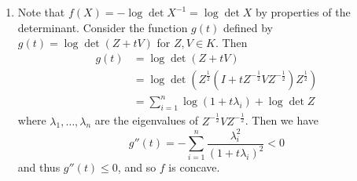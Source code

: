 \begin{enumerate}[label*=Ex \arabic*.]
\begin{enumerate}
  \item
    Note that $f(X) = - \log \det X^{-1} = \log \det X$ by
    properties of the determinant. Consider the function $g(t)$
    defined by $g(t) = \log \det (Z + tV)$ for $Z, V \in K$.  Then
    \begin{align}
      \label{eq:6}
      g(t) &= \log \det (Z + tV) \\
      &= \log \det (Z^{\frac{1}{2}}(I + t Z^{-\frac{1}{2}} V
      Z^{-\frac{1}{2}})Z^{\frac{1}{2}}) \\
      &= \sum_{i=1}^{n} \log (1 + t \lambda_{i}) + \log \det Z
    \end{align} where $\lambda_{1}, \dots, \lambda_{n}$ are the
    eigenvalues of $Z^{-\frac{1}{2}} V Z^{-\frac{1}{2}}$.  Then we
    have
    \begin{equation}
      \label{eq:9}
      g''(t) = -\sum_{i=1}^{n} \frac{\lambda_{i}^{2}}{(1 + t
        \lambda_{i})^{2}} < 0
    \end{equation} and thus $g''(t) \leq 0$, and so $f$ is concave.
  \end{enumerate}
\end{enumerate}

